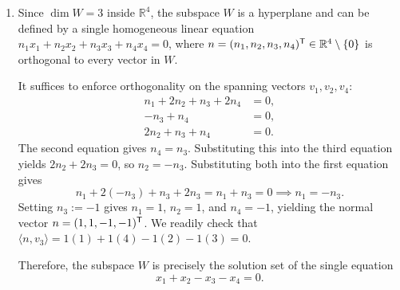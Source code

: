 \begin{exercisesolution*}
\begin{enumerate}[label=\textbf{(\alph*)}]
    \item Since $\dim W = 3$ inside $\mathbb{R}^4$, the subspace $W$ is a hyperplane and can be defined by a single homogeneous linear equation $n_1 x_1 + n_2 x_2 + n_3 x_3 + n_4 x_4 = 0$, where $n = (n_1, n_2, n_3, n_4)^{\mathsf{T}} \in \mathbb{R}^4 \setminus \{0\}$ is orthogonal to every vector in $W$.
    
    It suffices to enforce orthogonality on the spanning vectors $v_1, v_2, v_4$:
    \[
        \begin{aligned}
            n_1 + 2n_2 + n_3 + 2n_4 &= 0, \\
            -n_3 + n_4 &= 0, \\
            2n_2 + n_3 + n_4 &= 0.
        \end{aligned}
    \]
    The second equation gives $n_4 = n_3$. Substituting this into the third equation yields $2n_2 + 2n_3 = 0$, so $n_2 = -n_3$. Substituting both into the first equation gives
    \[
        n_1 + 2(-n_3) + n_3 + 2n_3 = n_1 + n_3 = 0 \implies n_1 = -n_3.
    \]
    Setting $n_3 := -1$ gives $n_1 = 1$, $n_2 = 1$, and $n_4 = -1$, yielding the normal vector $n = (1, 1, -1, -1)^{\mathsf{T}}$. We readily check that $\langle n, v_3 \rangle = 1(1) + 1(4) - 1(2) - 1(3) = 0$.
    
    Therefore, the subspace $W$ is precisely the solution set of the single equation
    \[
        x_1 + x_2 - x_3 - x_4 = 0.
    \]


\end{enumerate}
\end{exercisesolution*}
